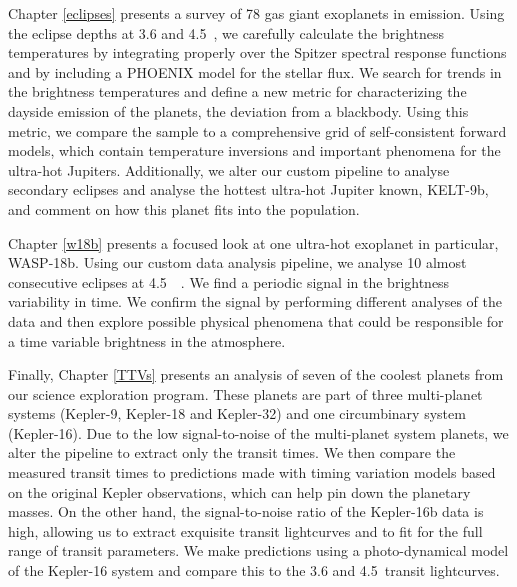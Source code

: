 Chapter \ref{eclipses} presents a survey of 78 gas giant exoplanets in emission. Using the eclipse depths at 3.6 and 4.5~\um, we carefully calculate the brightness temperatures by integrating properly over the Spitzer spectral response functions and by including a PHOENIX model for the stellar flux. We search for trends in the brightness temperatures and define a new metric for characterizing the dayside emission of the planets, the deviation from a blackbody. Using this metric, we compare the sample to a comprehensive grid of self-consistent forward models, which contain temperature inversions and important phenomena for the ultra-hot Jupiters. Additionally, we alter our custom pipeline to analyse secondary eclipses and analyse the hottest ultra-hot Jupiter known, KELT-9b, and comment on how this planet fits into the population.

Chapter \ref{w18b} presents a focused look at one ultra-hot exoplanet in particular, WASP-18b. Using our custom data analysis pipeline, we analyse 10 almost consecutive eclipses at 4.5~\um~. We find a periodic signal in the brightness variability in time. We confirm the signal by performing different analyses of the data and then explore possible physical phenomena that could be responsible for a time variable brightness in the atmosphere.

Finally, Chapter \ref{TTVs} presents an analysis of seven of the coolest planets from our science exploration program. These planets are part of three multi-planet systems (Kepler-9, Kepler-18 and Kepler-32) and one circumbinary system (Kepler-16). Due to the low signal-to-noise of the multi-planet system planets, we alter the pipeline to extract only the transit times. We then compare the measured transit times to predictions made with timing variation models based on the original Kepler observations, which can help pin down the planetary masses. On the other hand, the signal-to-noise ratio of the Kepler-16b data is high, allowing us to extract exquisite transit lightcurves and to fit for the full range of transit parameters. We make predictions using a photo-dynamical model of the Kepler-16 system and compare this to the 3.6 and 4.5~\um transit lightcurves.


